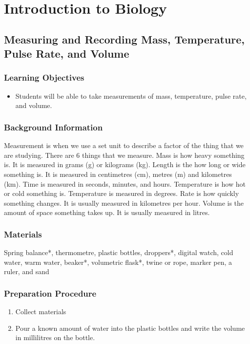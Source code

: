 \section{Introduction to Biology}

\subsection{Measuring and Recording Mass, Temperature, Pulse Rate, and Volume}

\subsubsection*{Learning Objectives}
\begin{itemize}
\item{Students will be able to take measurements of mass, temperature, pulse rate, and volume.}
\end{itemize}

\subsubsection*{Background Information}
Measurement is when we use a set unit to describe a factor of the thing that we are studying. There are 6 things that we measure. Mass is how heavy something is. It is measured in grams (g) or kilograms (kg). Length is the how long or wide something is. It is measured in centimetres (cm), metres (m) and kilometres (km). Time is measured in seconds, minutes, and hours. Temperature is how hot or cold something is. Temperature is measured in degrees. Rate is how quickly something changes. It is usually measured in kilometres per hour. Volume is the amount of space something takes up. It is usually measured in litres.

\subsubsection*{Materials}
Spring balance*, thermometre, plastic bottles, droppers*, digital watch, cold water, warm water, beaker*, volumetric flask*, twine or rope, marker pen, a ruler, and sand

\subsubsection*{Preparation Procedure}
\begin{enumerate}
\item{Collect materials}
\item{Pour a known amount of water into the plastic bottles and write the volume in millilitres on the bottle.}
\end{enumerate}

